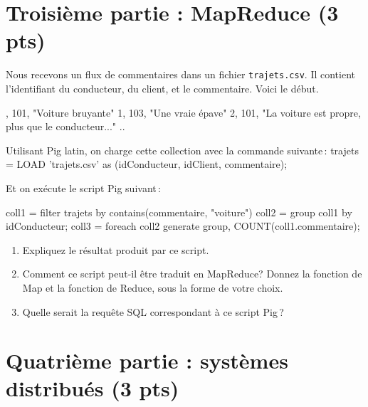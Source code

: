 \documentclass[10pt,a4paper]{article}
\newenvironment{smallverbatim}%
{\endgraf\small\verbatim}{\endverbatim}
\begin{document}
\section*{Troisième partie : MapReduce (3 pts)}

Nous recevons un flux de commentaires dans
un fichier \texttt{trajets.csv}. Il contient l'identifiant
du conducteur, du client, et le commentaire. Voici le début.

\begin{smallverbatim}
1, 101, "Voiture bruyante"
1, 103, "Une vraie épave"
2, 101, "La voiture est propre, plus que le conducteur..."
..
\end{smallverbatim}

Utilisant Pig latin, on charge cette collection avec la commande suivante\,:
\begin{smallverbatim}
trajets = LOAD 'trajets.csv' as (idConducteur, idClient, commentaire);
\end{smallverbatim}

Et on exécute le script Pig suivant\,:

\begin{smallverbatim}
coll1 = filter trajets by contains(commentaire, "voiture")
coll2 = group coll1 by idConducteur;
coll3  = foreach coll2 generate group, COUNT(coll1.commentaire);
\end{smallverbatim} 

\begin{enumerate}
 \item Expliquez le résultat produit par ce script.
 \item Comment ce script peut-il être traduit en MapReduce? Donnez la fonction
    de Map et la fonction de Reduce, sous la forme de votre choix.
\item Quelle serait la requête SQL correspondant à ce script Pig\,?

\end{enumerate}

\section*{Quatrième partie : systèmes distribués (3 pts)}
\end{document}
